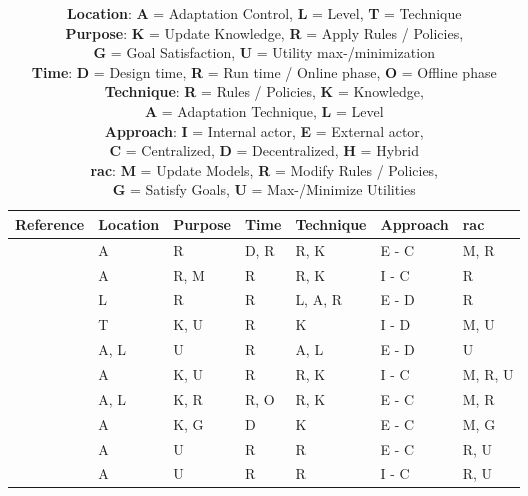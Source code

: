 \begin{table}[h]
    \centering
    \begin{tabular}{|l|l|l|l|l|l|l|}
        \hline
        \textbf{Reference} & \textbf{Location} & \textbf{Purpose} & \textbf{Time} & \textbf{Technique} & \textbf{Approach} & \textbf{\acrshort{rac}} \\
        \hline
        \hline
        \cite*{FUSION} & A & R & D, R & R, K & E - C & M, R \\
        \hline
        \cite*{LearningRevisedModels} & A & R, M & R & R, K & I - C & R \\
        \hline
        \cite*{FIoT} & L & R & R & L, A, R & E - D & R \\
        \hline
        \cite*{ML1} & T & K, U & R & K & I - D & M, U \\
        \hline
        \cite*{ML2} & A, L & U & R & A, L & E - D & U \\
        \hline
        \cite*{ML7} & A & K, U & R & R, K & I - C & M, R, U \\
        \hline
        \cite*{ML8} & A, L & K, R & R, O & R, K & E - C & M, R \\
        \hline
        \cite*{ML11} & A & K, G & D & K & E - C & M, G \\
        \hline
        \cite*{ML12} & A & U & R & R & E - C & R, U \\
        \hline
        \cite*{ML14} & A & U & R & R & I - C & R, U \\
        \hline
    \end{tabular}
    \caption{
        \textbf{Location}: \textbf{A} = Adaptation Control, \textbf{L} = Level, \textbf{T} = Technique \\
        \textbf{Purpose}: \textbf{K} = Update Knowledge, \textbf{R} = Apply Rules / Policies, \\
            \indent\textbf{G} = Goal Satisfaction, \textbf{U} = Utility max-/minimization \\
        \textbf{Time}: \textbf{D} = Design time, \textbf{R} = Run time / Online phase, \textbf{O} = Offline phase \\
        \textbf{Technique}: \textbf{R} = Rules / Policies, \textbf{K} = Knowledge, \\
            \indent\textbf{A} = Adaptation Technique, \textbf{L} = Level \\
        \textbf{Approach}: \textbf{I} = Internal actor, \textbf{E} = External actor, \\
            \indent\textbf{C} = Centralized, \textbf{D} = Decentralized, \textbf{H} = Hybrid \\
        \textbf{\acrshort{rac}}: \textbf{M} = Update Models, \textbf{R} = Modify Rules / Policies, \\
            \indent\textbf{G} = Satisfy Goals, \textbf{U} = Max-/Minimize Utilities
    }
    \label{table:ClassifyingExisting}
\end{table}

